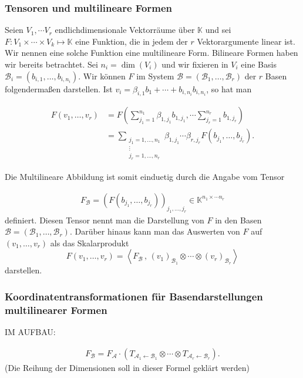 \documentclass[
a4paper,12pt,
bibliography=totocnumbered,
numbers=noenddot,
]{scrartcl}
\numberwithin{equation}{subsection}
\newcommand{\K}{\mathbb K}
\newcommand{\cA}{\mathcal{A}}
\newcommand{\cB}{\mathcal{B}}
\theoremstyle{plain}
\theoremstyle{definition}
\begin{document}
\subsubsection{Tensoren und multilineare Formen} 

Seien $V_1, \cdots V_r$ endlichdimensionale Vektorräume über $\K$ und sei $F : V_1 \times \cdots \times V_k \mapsto \K$ eine Funktion, die in jedem der $r$ Vektorargumente linear ist. Wir nennen eine solche Funktion eine multilineare Form. Bilineare Formen haben wir bereits betrachtet. Sei $n_i  = \dim(V_i)$ und wir fixieren in $V_i$ eine Basis $\cB_i = (b_{i,1},\ldots, b_{i,n_i})$. Wir können $F$ im System $\cB= (\cB_1,\ldots,\cB_r)$ der $r$ Basen folgendermaßen darstellen. Ist $v_i = \beta_{i,1} b_1 + \cdots + b_{i,n_i} b_{i,n_i}$, so hat man 

\begin{align*}
	F(v_1,\ldots,v_r) & = F \left( \sum_{j_1=1}^{n_1} \beta_{1,j_1} b_{1,j_1}, \cdots \sum_{j_r=1}^{n_r} b_{1,j_r} \right) 
	\\ & = \sum_{ \substack{ j_1 =1,\ldots,n_1 \\ \vdots \\ j_r = 1,\ldots,n_r} } \beta_{1,j_1} \cdots \beta_{r,j_r} F(b_{j_1},\ldots, b_{j_r}). 
\end{align*}

Die Multilineare Abbildung ist somit einduetig durch die Angabe vom Tensor 

\begin{align*}
			F_\cB = \left( F(b_{j_1},\ldots, b_{j_r}) \right)_{j_1,\ldots,j_r} \in \K^{n_1 \times \cdots n_r}
\end{align*} 
definiert. Diesen Tensor nennt man die Darstellung von $F$ in den Basen $\cB=(\cB_1,\ldots,\cB_r)$.  Darüber hinaus kann man das Auswerten von $F$ auf $(v_1,\ldots,v_r)$ als das Skalarprodukt
\[
	F(v_1,\ldots,v_r) = \left< F_\cB \, , \, (v_1)_{\cB_1} \otimes \cdots \otimes (v_r)_{\cB_r} \right>
\]
darstellen. 

\subsubsection{Koordinatentransformationen für Basendarstellungen multilinearer Formen}

IM AUFBAU:  

\begin{align*}
	F_\cB = F_\cA \cdot ( T_{\cA_1 \leftarrow \cB_1}  \otimes \cdots \otimes T_{\cA_r \leftarrow \cB_r} ). 
\end{align*}
(Die Reihung der Dimensionen soll in dieser Formel geklärt werden)
\end{document}
